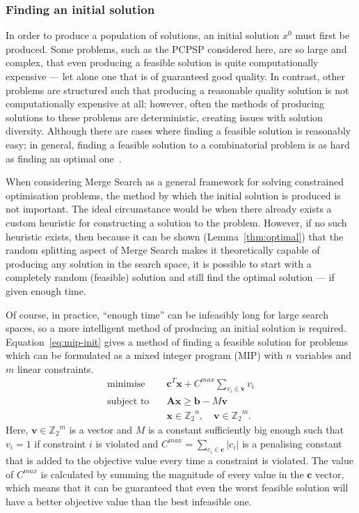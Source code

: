\documentclass[authoryear,11pt,square,number,times,super,comma]{elsarticle}
\newcommand{\V}[1]{\ensuremath{\boldsymbol{#1}}}
\newcommand{\M}[1]{\ensuremath{\boldsymbol{#1}}}
\newcommand{\Min}{\ensuremath{\text{minimise}}}
\newcommand{\ST}{\ensuremath{\text{subject to}}}
\newcommand{\Bin}{\ensuremath{\mathbb{Z}_2}}
\begin{document}
\subsubsection*{Finding an initial solution}
In order to produce a population of solutions, an initial solution $x^0$ must first be produced.
Some problems, such as the PCPSP considered here, are so large and complex, that even producing a feasible solution is quite computationally expensive --- let alone one that is of guaranteed good quality. In contrast, other problems are structured such that producing a reasonable quality solution is not computationally expensive at all; however, often the methods of producing solutions to these problems are deterministic, creating issues with solution diversity. Although there are cases where finding a feasible solution is reasonably easy; in general, finding a feasible solution to a combinatorial problem is as hard as finding an optimal one~\citep{Papadimitriou1982}.

When considering Merge Search as a general framework for solving constrained optimisation problems, the method by which the initial solution is produced is not important. The ideal circumstance would be when there already exists a custom heuristic for constructing a solution to the problem. However, if no such heuristic exists, then because it can be shown (Lemma~\ref{thm:optimal}) that the random splitting aspect of Merge Search makes it theoretically capable of producing any solution in the search space, it is possible to start with a completely random (feasible) solution and still find the optimal solution --- if given enough time.

Of course, in practice, ``enough time'' can be infeasibly long for large search spaces, so a more intelligent method of producing an initial solution is required. Equation~\ref{eq:mip-init} gives a method of finding a feasible solution for problems which can be formulated as a mixed integer program (MIP) with $n$ variables and $m$ linear constraints.
%
\begin{align}\label{eq:mip-init}
              \Min \quad &\V{c}^T\V{x} + C^{max} \sum_{v_i \in \V{v}} v_i\\
              \ST  \quad  &\M{A}\V{x} \ge \V{b}-M\V{v}\nonumber\\
                   \quad & \V{x} \in \Bin^n, \quad \V{v} \in \Bin^m.\nonumber
\end{align}
%
Here, $\V{v} \in \Bin^m$ is a vector and $M$ is a constant sufficiently big enough such that $v_i = 1$ if constraint $i$ is violated and $C^{max} = \sum_{c_i \in \V{c}} |c_i|$ is a penalising constant that is added to the objective value every time a constraint is violated. The value of $C^{max}$ is calculated by summing the magnitude of every value in the $\V{c}$ vector, which means that it can be guaranteed that even the worst feasible solution will have a better objective value than the best infeasible one.
\end{document}
